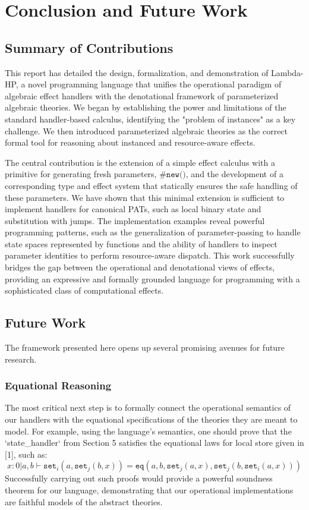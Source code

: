\documentclass{article}
\begin{document}
\section{Conclusion and Future Work}

\subsection{Summary of Contributions}
This report has detailed the design, formalization, and demonstration of Lambda-HP, a novel programming language that unifies the operational paradigm of algebraic effect handlers with the denotational framework of parameterized algebraic theories. We began by establishing the power and limitations of the standard handler-based calculus, identifying the "problem of instances" as a key challenge. We then introduced parameterized algebraic theories as the correct formal tool for reasoning about instanced and resource-aware effects.

The central contribution is the extension of a simple effect calculus with a primitive for generating fresh parameters, $\texttt{\#new()}$, and the development of a corresponding type and effect system that statically ensures the safe handling of these parameters. We have shown that this minimal extension is sufficient to implement handlers for canonical PATs, such as local binary state and substitution with jumps. The implementation examples reveal powerful programming patterns, such as the generalization of parameter-passing to handle state spaces represented by functions and the ability of handlers to inspect parameter identities to perform resource-aware dispatch. This work successfully bridges the gap between the operational and denotational views of effects, providing an expressive and formally grounded language for programming with a sophisticated class of computational effects.

\subsection{Future Work}
The framework presented here opens up several promising avenues for future research.

\subsubsection{Equational Reasoning}
The most critical next step is to formally connect the operational semantics of our handlers with the equational specifications of the theories they are meant to model. For example, using the language's semantics, one should prove that the `state_handler` from Section 5 satisfies the equational laws for local store given in [1], such as:
$$
x:0|a,b \vdash \texttt{set}_{i}(a,\texttt{set}_{j}(b,x)) = \texttt{eq}(a,b,\texttt{set}_{j}(a,x),\texttt{set}_{j}(b,\texttt{set}_{i}(a,x)))
$$
Successfully carrying out such proofs would provide a powerful soundness theorem for our language, demonstrating that our operational implementations are faithful models of the abstract theories.
\end{document}

